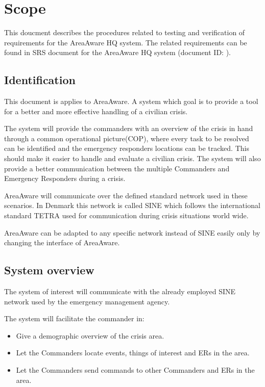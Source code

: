 \chapter{Scope}
\label{chp:scope}

This doucment describes the procedures related to testing and verification of requirements for the AreaAware HQ system. The related requirements can be found in SRS document for the AreaAware HQ system (document ID: \srshq).

\section{Identification}
This document is applies to AreaAware.
A system which goal is to provide a tool for a better and more effective handling of a civilian crisis.

The system will provide the commanders with an overview of the crisis in hand through a common operational picture(COP), where every task to be resolved can be identified and the emergency responders locations can be tracked.
This should make it easier to handle and evaluate a civilian crisis. 
The system will also provide a better communication between the multiple Commanders and Emergency Responders during a crisis.

AreaAware will communicate over the defined standard network used in these scenarios.
In Denmark this network is called SINE which follows the international standard TETRA used for communication during crisis situations world wide.

AreaAware can be adapted to any specific network instead of SINE easily only by changing the interface of AreaAware.


\section{System overview}
The system of interest will communicate with the already employed SINE network used by the emergency management agency.

The system will facilitate the commander in:
\begin{itemize}
	\item Give a demographic overview of the crisis area.
	\item Let the Commanders locate events, things of interest and ERs in the area.
	\item Let the Commanders send commands to other Commanders and ERs in the area.
\end{itemize}

